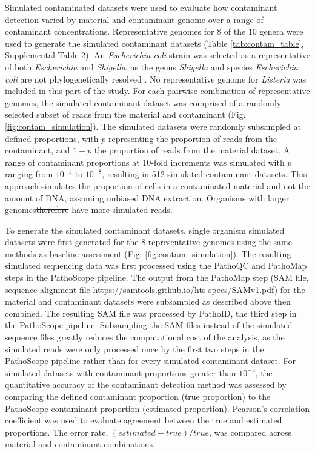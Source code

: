 \documentclass[fleqn,10pt,lineno]{wlpeerj}\usepackage[]{graphicx}\usepackage[]{color}
\providecommand{\DIFaddtex}[1]{{\protect\color{blue}\uwave{#1}}} %
\providecommand{\DIFdeltex}[1]{{\protect\color{red}\sout{#1}}}                      %
\providecommand{\DIFaddbegin}{} %
\providecommand{\DIFaddend}{} %
\providecommand{\DIFdelbegin}{} %
\providecommand{\DIFdelend}{} %
\providecommand{\DIFadd}[1]{\texorpdfstring{\DIFaddtex{#1}}{#1}} %
\providecommand{\DIFdel}[1]{\texorpdfstring{\DIFdeltex{#1}}{}} %
\begin{document}
Simulated contaminated datasets were used to evaluate how contaminant detection varied by material and contaminant genome over a range of contaminant concentrations.
Representative genomes for 8 of the 10 genera were used to generate the simulated contaminant datasets (Table \ref{tab:contam_table}, Supplemental Table 2).
An \textit{Escherichia coli} strain was selected as a representative of both \textit{Escherichia} and \textit{Shigella}, as the genus \textit{Shigella} and species \textit{Escherichia coli} are not phylogenetically resolved \citep{lan2002escherichia}. 
No representative genome for \textit{Listeria} was included in this part of the study. 
For each pairwise combination of representative genomes, the simulated contaminant dataset was comprised of a randomly selected subset of reads from the material and contaminant (Fig. \ref{fig:contam_simulation}).
The simulated datasets were randomly subsampled at defined proportions, with $p$ representing the proportion of reads from the contaminant, and $1-p$ the proportion of reads from the material dataset.
A range of contaminant proportions at 10-fold increments was simulated with $p$ ranging from $10^{-1}$ to $10^{-8}$, resulting in 512 simulated contaminant datasets.
This approach simulates the proportion of cells in a contaminated material and not the amount of DNA, assuming unbiased DNA extraction.
Organisms with larger genomes\DIFdelbegin \DIFdel{therefore }\DIFdelend \DIFaddbegin \DIFadd{, therefore, }\DIFaddend have more simulated reads.


To generate the simulated contaminant datasets, single organism simulated datasets were first generated for the 8 representative genomes using the same methods as baseline assessment (Fig. \ref{fig:contam_simulation}\DIFaddbegin \DIFadd{, Table \ref{tab:contam_table}}\DIFaddend ).
The resulting simulated sequencing data was first processed using the PathoQC and PathoMap steps in the PathoScope pipeline.
The output from the PathoMap step (SAM file, sequence alignment file \url{https://samtools.github.io/hts-specs/SAMv1.pdf}) for the material and contaminant datasets were subsampled as described above then combined.
The resulting SAM file was processed by PathoID, the third step in the PathoScope pipeline.
Subsampling the SAM files instead of the simulated sequence files greatly reduces the computational cost of the analysis, as the simulated reads were only processed once by the first two steps in the PathoScope pipeline rather than for every simulated contaminant dataset. 
For simulated datasets with contaminant proportions greater than $10^{-5}$, the quantitative accuracy of the contaminant detection method was assessed by comparing the defined contaminant proportion (true proportion) to the PathoScope contaminant proportion (estimated proportion). 
Pearson's correlation coefficient was used to evaluate agreement between the true and estimated proportions. 
The error rate, $(estimated-true)/true$, was compared across material and contaminant combinations.
\end{document}

